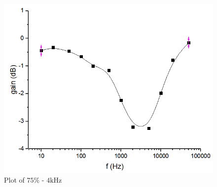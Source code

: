 \begin{figure}
	\centering
	\begin{framed}
		\includegraphics[width=\linewidth]{images/22.PNG}
		\caption{Plot of $75\%$ - $4\si{\kilo\hertz}$}
		\label{fig:plot22}
	\end{framed}
\end{figure}